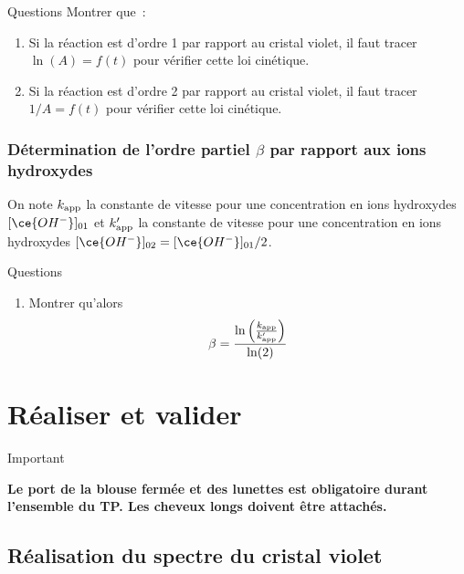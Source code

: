 \documentclass[a4paper, 11pt, final, garamond]{book}
\begin{document}
\begin{rexem}{Questions}
    Montrer que~:
    \begin{enumerate}[label*=\protect\fbox{\arabic{enumi}}, start=4]
        \item Si la réaction est d'ordre 1 par rapport au cristal violet, il
            faut tracer $\ln(A)=f(t)$ pour vérifier cette loi cinétique.
        \item Si la réaction est d'ordre 2 par rapport au cristal violet, il
            faut tracer $1/A=f(t)$ pour vérifier cette loi cinétique.
    \end{enumerate}
\end{rexem}

\subsubsection{Détermination de l'ordre partiel $\beta$ par rapport aux ions
hydroxydes}

On note $k_{\rm app}$ la constante de vitesse pour une concentration en ions
hydroxydes $[\ce{OH^-}]_{01}$ et $k_{\rm app}'$ la constante de vitesse pour une
concentration en ions hydroxydes $[\ce{OH^-}]_{02}=[\ce{OH^-}]_{01}/2$.

\begin{rexem}{Questions}
    \begin{enumerate}[label*=\protect\fbox{\arabic{enumi}}, start=6]
        \item Montrer qu'alors 
            \[\beta = \frac{\ln\left(\frac{k_{\rm app}}{k_{\rm app}'}\right)}{\ln(2)}\]
    \end{enumerate}
\end{rexem}

\section{Réaliser et valider}

\begin{NCror}[width=\linewidth]{Important}
    \begin{center}
        \bfseries
        Le port de la blouse fermée et des lunettes est obligatoire durant
        l'ensemble du TP. Les cheveux longs doivent être attachés.
    \end{center}
\end{NCror}

\subsection{Réalisation du spectre du cristal violet}
\end{document}
